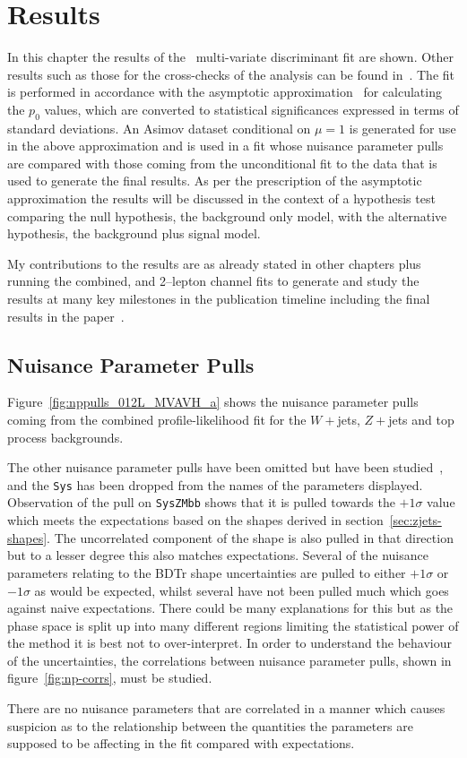 \chapter{Results}%
\label{ch:results}
In this chapter the results of the \VHbb\ multi-variate discriminant fit are
shown. Other results such as those for the cross-checks of the analysis can be
found in~\cite{VHMainNote2019}. The fit is performed in accordance with the
asymptotic approximation~\cite{Cowan:2010js} for calculating the $p_0$ values,
which are converted to statistical significances expressed in terms of standard
deviations. An Asimov dataset conditional on $\mu=1$  is generated for use in
the above approximation and is used in a fit whose nuisance parameter pulls are
compared with those coming from the unconditional fit to the data that is used
to generate the final results. As per the prescription of the asymptotic
approximation the results will be discussed in the context of a hypothesis test
comparing the null hypothesis, the background only model, with the alternative
hypothesis, the background plus signal model.

My contributions to the results are as already stated in other chapters plus
running the combined, and 2--lepton channel fits to generate and study the
results at many key milestones in the publication timeline including the final
results in the paper~\cite{final-paper}.

\section{Nuisance Parameter Pulls}
Figure~\ref{fig:nppulls_012L_MVAVH_a} shows the nuisance parameter pulls coming
from the combined profile-likelihood fit for the $W+$jets, $Z+$jets and top
process backgrounds.

The other nuisance parameter pulls have been omitted but have been
studied~\cite{VHMainNote2019}, and the \texttt{Sys} has been dropped from the
names of the parameters displayed. Observation of the pull on \texttt{SysZMbb}
shows that it is pulled towards the $+1\sigma$ value which meets the
expectations based on the shapes derived in section~\ref{sec:zjets-shapes}. The
uncorrelated component of the shape is also pulled in that direction but to a
lesser degree this also matches expectations. Several of the nuisance parameters
relating to the BDTr shape uncertainties are pulled to either $+1\sigma$ or
$-1\sigma$ as would be expected, whilst several have not been pulled much which
goes against naive expectations. There could be many explanations for this but
as the phase space is split up into many different regions limiting the
statistical power of the method it is best not to over-interpret. In order to
understand the behaviour of the uncertainties, the correlations between nuisance
parameter pulls, shown in figure~\ref{fig:np-corrs}, must be studied.

There are no nuisance parameters that are correlated in a manner which causes
suspicion as to the relationship between the quantities the parameters are
supposed to be affecting in the fit compared with expectations.
\clearpage
